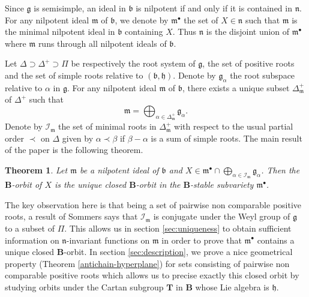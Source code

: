 \documentclass[10pt,a4paper]{amsart}
\newcommand{\soc}[1]{\mathcal{I}_{#1}}
\newcommand{\group}[1]{\mathbf{#1}}
\numberwithin{equation}{section}
\theoremstyle{plain}
\newtheorem{theorem}{Theorem}[section]
\theoremstyle{definition}
\theoremstyle{remark}
\begin{document}
Since $\mathfrak{g}$ is semisimple,
an ideal in $\mathfrak{b}$ is nilpotent if and only if it is contained in $\mathfrak{n}$.
For any nilpotent ideal $\mathfrak{m}$ of $\mathfrak{b}$, we denote by $\mathfrak{m}^{\bullet}$
the set of $X\in \mathfrak{n}$ such that $\mathfrak{m}$ is the minimal nilpotent ideal in $\mathfrak{b}$
containing $X$. Thus $\mathfrak{n}$ is the disjoint union of $\mathfrak{m}^{\bullet}$ where $\mathfrak{m}$
runs through all nilpotent ideals of $\mathfrak{b}$.

Let $\Delta \supset \Delta^{+} \supset \Pi$ be respectively the root system of $\mathfrak{g}$, the 
set of positive roots and the set of simple roots relative to $( \mathfrak{b} , \mathfrak{h})$. Denote by 
$\mathfrak{g}_{\alpha}$ the root subspace relative to $\alpha$ in $\mathfrak{g}$. 
For any nilpotent ideal $\mathfrak{m}$ of $\mathfrak{b}$, there exists a unique subset 
$\Delta_{\mathfrak{m}}^{+}$ of $\Delta^{+}$ such that
$$
\mathfrak{m} = \bigoplus_{\alpha\in \Delta^{+}_{\mathfrak{m}}} \mathfrak{g}_{\alpha}.
$$
Denote by $\soc{\mathfrak{m}}$ the set of minimal roots in $\Delta_{\mathfrak{m}}^{+}$
with respect to the usual partial order $\prec$ on $\Delta$ given by 
$\alpha \prec \beta$ if $\beta - \alpha$ is a sum of simple roots. 
The main result of the paper is the following theorem.

\begin{theorem}\label{main-theorem}
Let $\mathfrak{m}$ be a nilpotent ideal of $\mathfrak{b}$ and 
$X\in \mathfrak{m}^{\bullet}\cap \bigoplus_{\alpha \in \soc{\mathfrak{m}}} \mathfrak{g}_{\alpha}$.
Then the $\group{B}$-orbit of $X$ is the unique closed $\group{B}$-orbit in the $\group{B}$-stable 
subvariety $\mathfrak{m}^{\bullet}$.
\end{theorem}

The key observation here is that being a set of pairwise non comparable positive
roots, a result of Sommers \cite{So} says that $\soc{\mathfrak{m}}$ is conjugate 
under the Weyl group of $\mathfrak{g}$ to a subset of $\Pi$. This allows us 
in section \ref{sec:uniqueness} to obtain sufficient information on $\mathfrak{n}$-invariant functions on 
$\mathfrak{m}$ in order to prove that $\mathfrak{m}^{\bullet}$ contains a unique 
closed $\group{B}$-orbit. In section \ref{sec:description}, we prove a nice geometrical
property (Theorem \ref{antichain-hyperplane})
for sets consisting of pairwise non comparable positive roots which allows us to precise 
exactly this closed orbit by studying orbits under the Cartan subgroup $\group{T}$ in 
$\group{B}$ whose Lie algebra is $\mathfrak{h}$.
\smallskip
\end{document}
